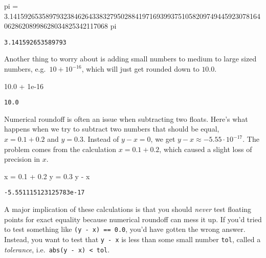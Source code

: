 \documentclass[
  letterpaper,
  DIV=11,
  numbers=noendperiod]{scrreprt}
\newenvironment{Shaded}{\begin{snugshade}}{\end{snugshade}}
\newcommand{\FloatTok}[1]{\textcolor[rgb]{0.68,0.00,0.00}{#1}}
\newcommand{\NormalTok}[1]{\textcolor[rgb]{0.00,0.23,0.31}{#1}}
\newcommand{\OperatorTok}[1]{\textcolor[rgb]{0.37,0.37,0.37}{#1}}
\begin{document}
\begin{Shaded}
\begin{Highlighting}[]
\NormalTok{pi }\OperatorTok{=} \FloatTok{3.141592653589793238462643383279502884197169399375105820974944592307816406286208998628034825342117068}
\NormalTok{pi}
\end{Highlighting}
\end{Shaded}

\begin{verbatim}
3.141592653589793
\end{verbatim}

Another thing to worry about is adding small numbers to medium to large
sized numbers, e.g.~\(10 + 10^{-16}\), which will just get rounded down
to \(10.0\).

\begin{Shaded}
\begin{Highlighting}[]
\FloatTok{10.0} \OperatorTok{+} \FloatTok{1e{-}16}
\end{Highlighting}
\end{Shaded}

\begin{verbatim}
10.0
\end{verbatim}

Numerical roundoff is often an issue when subtracting two floats. Here's
what happens when we try to subtract two numbers that should be equal,
\(x=0.1+0.2\) and \(y=0.3\). Instead of \(y-x=0\), we get
\(y-x \approx -5.55 \cdot 10^{-17}\). The problem comes from the
calculation \(x=0.1+0.2\), which caused a slight loss of precision in
\(x\).

\begin{Shaded}
\begin{Highlighting}[]
\NormalTok{x }\OperatorTok{=} \FloatTok{0.1} \OperatorTok{+} \FloatTok{0.2}
\NormalTok{y }\OperatorTok{=} \FloatTok{0.3}
\NormalTok{y }\OperatorTok{{-}}\NormalTok{ x}
\end{Highlighting}
\end{Shaded}

\begin{verbatim}
-5.551115123125783e-17
\end{verbatim}

A major implication of these calculations is that you should
\emph{never} test floating points for exact equality because numerical
roundoff can mess it up. If you'd tried to test something like
\texttt{(y\ -\ x)\ ==\ 0.0}, you'd have gotten the wrong answer.
Instead, you want to test that \texttt{y\ -\ x} is less than some small
number \texttt{tol}, called a \emph{tolerance},
i.e.~\texttt{abs(y\ -\ x)\ \textless{}\ tol}.
\end{document}
